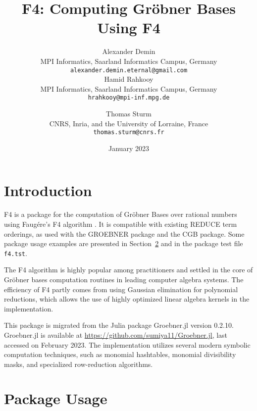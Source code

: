 \documentclass{article}
\newcommand{\grobner}{Gr\"obner}
\newcommand{\faugere}{Faug\'ere}
\newcommand{\code}[1]{\texttt{#1}}
\begin{document}
\title{F4: Computing Gröbner Bases Using F4}

\author{
  Alexander Demin\\
  MPI Informatics, Saarland Informatics Campus, Germany\\
  \texttt{alexander.demin.eternal@gmail.com}\\
  Hamid Rahkooy\\
  MPI Informatics, Saarland Informatics Campus, Germany\\
  \texttt{hrahkooy@mpi-inf.mpg.de}
  \and
  Thomas Sturm\\
  CNRS, Inria, and the University of Lorraine, France\\
  \texttt{thomas.sturm@cnrs.fr}
}

\date{January 2023}

\maketitle

\section{Introduction}

F4 is a package for the computation of \grobner{} Bases over rational numbers
using \faugere{}'s F4 algorithm \cite{F4}. It is compatible with existing REDUCE term
orderings, as used with the GROEBNER package and the CGB package. Some package usage examples are
presented in Section~\ref{SE:usage} and in the package test file
\code{f4.tst}.

The F4 algorithm is highly popular among practitioners and settled in the core of \grobner{} bases
computation routines in leading computer algebra systems. The efficiency of F4 partly comes from 
using Gaussian elimination for polynomial reductions, 
which allows the use of highly optimized linear algebra kernels in the implementation.

This package is migrated from the Julia package Groebner.jl version 0.2.10.
Groebner.jl is available at \url{https://github.com/sumiya11/Groebner.jl}, last accessed on February 2023.
The implementation utilizes several modern symbolic computation techniques, 
such as monomial hashtables, monomial divisibility masks, and specialized row-reduction algorithms.

\section{Package Usage}\label{SE:usage}
\end{document}
